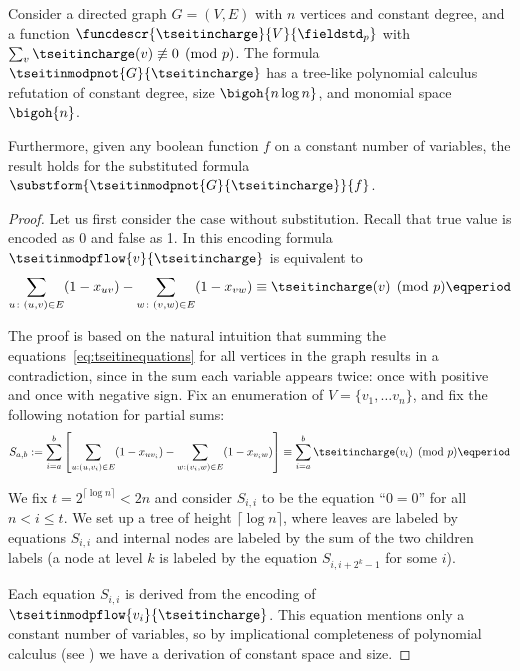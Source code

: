 \begin{lemma}\label{lmm:tseitinupperbound}
  Consider a directed graph $G=(V,E)$ with $n$ vertices and constant
  degree, and a function
  \mbox{$\funcdescr{\tseitincharge}{V}{\fieldstd_p}$}
  with
  $\sum_{v}\tseitincharge(v)\not\equiv 0 \pmod{p}$. The formula
  $\tseitinmodpnot{G}{\tseitincharge}$ has a tree-like polynomial calculus
  refutation of constant degree, size $\bigoh{n\log n}$, and monomial
  space $\bigoh{n}$.

  Furthermore, given any boolean function $f$ on a constant number of
  variables, the result holds for the substituted formula
  $\substform{\tseitinmodpnot{G}{\tseitincharge}}{f}$.
\end{lemma}

\begin{proof}
Let us first consider the case without substitution. Recall that true value is encoded as $0$ and false as 1. In this encoding formula $\tseitinmodpflow{v}{\tseitincharge}$ is equivalent to
  \begin{equation}\label{eq:tseitinequations}
    \sum_{u\colon(u,v)\in E} (1-x_{uv}) - \sum_{w\colon(v,w)\in E} (1-x_{vw})
    \equiv \tseitincharge(v) \pmod{p} \eqperiod
  \end{equation}

  The proof is based on the natural intuition that summing the
  equations~\eqref{eq:tseitinequations} for all vertices in the graph
  results in a contradiction, since in the sum each variable appears
  twice: once with positive and once with negative sign.
  Fix an enumeration of $V=\{v_{1},\ldots
  v_{n}\}$, and fix the following notation for partial sums:
  \begin{equation}
    S_{a,b}:=
    \sum^{b}_{i=a}
    \left[\sum_{u:(u,v_{i})\in E} (1-x_{uv_{i}})
    -
    \sum_{w:(v_{i},w)\in E} (1-x_{v_{i}w})\right]
    \equiv
    \sum^{b}_{i=a} \tseitincharge(v_{i}) \pmod{p} \eqperiod
  \end{equation}
  
  
  We fix $t=2^{\lceil \log n \rceil} < 2n$ and consider $S_{i,i}$ to
  be the equation ``$0=0$'' for all $n < i \leq t$.
  We set up a tree of height $\lceil \log n \rceil$, where leaves are
  labeled by equations $S_{i,i}$ and internal nodes are labeled by the
  sum of the two children labels (\ieComma a node at level $k$ is labeled
  by the equation $S_{i,i+2^{k}-1}$ for some $i$).

  Each equation $S_{i,i}$ is derived from the encoding of
  $\tseitinmodpflow{v_{i}}{\tseitincharge}$. This equation mentions only a constant
  number of variables, so by implicational completeness of polynomial
  calculus (see ) we have a derivation
  of constant space and size.


\end{proof}
